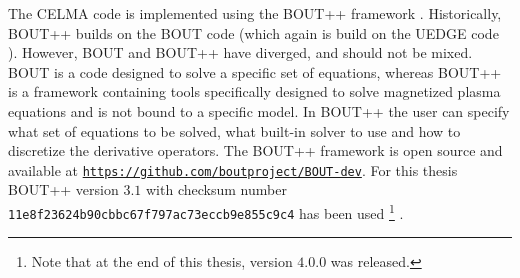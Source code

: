 \label{chap:BOUT++}
The CELMA code is implemented using the BOUT++ framework \cite{Dudson2009,Dudson2014a,Dudson2016}.
Historically, BOUT++ builds on the BOUT code \cite{Xu1998} (which again is build on the UEDGE code \cite{Rognlien1996}).
However, BOUT and BOUT++ have diverged, and should not be mixed.
BOUT is a code designed to solve a specific set of equations, whereas BOUT++ is a framework containing tools specifically designed to solve magnetized plasma equations and is not bound to a specific model.
In BOUT++ the user can specify what set of equations to be solved, what built-in solver to use and how to discretize the derivative operators.
The BOUT++ framework is open source and available at \href{https://github.com/boutproject/BOUT-dev}{\texttt{https://github.com/boutproject/BOUT-dev}}.
For this thesis BOUT++ version $3.1$ with checksum number \texttt{11e8f23624b90cbbc67f797ac73eccb9e855c9c4} has been used%
%
\footnote{Note that at the end of this thesis, version $4.0.0$ was released.}%
%
.
